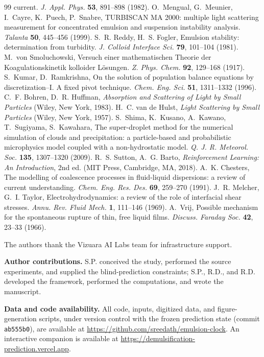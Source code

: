 \documentclass[aps,prfluids,reprint,amsmath,amssymb,superscriptaddress,longbibliography]{revtex4-2}
\begin{document}
\begin{thebibliography}{99}
current. \emph{J. Appl. Phys.} \textbf{53}, 891--898 (1982).
 O.~Mengual, G.~Meunier, I.~Cayre, K.~Puech,
P.~Snabre, TURBISCAN MA 2000: multiple light scattering measurement for
concentrated emulsion and suspension instability analysis. \emph{Talanta}
\textbf{50}, 445--456 (1999).
 S.~R. Reddy, H.~S. Fogler, Emulsion stability:
determination from turbidity. \emph{J. Colloid Interface Sci.} \textbf{79},
101--104 (1981).
 M.~von Smoluchowski, Versuch einer mathematischen
Theorie der Koagulationskinetik kolloider L\"osungen. \emph{Z. Phys. Chem.}
\textbf{92}, 129--168 (1917).
 S.~Kumar, D.~Ramkrishna, On the solution of population
balance equations by discretization--I. A fixed pivot technique.
\emph{Chem. Eng. Sci.} \textbf{51}, 1311--1332 (1996).
 C.~F. Bohren, D.~R. Huffman, \emph{Absorption and
Scattering of Light by Small Particles} (Wiley, New York, 1983).
 H.~C. van de Hulst, \emph{Light Scattering by Small
Particles} (Wiley, New York, 1957).
 S.~Shima, K.~Kusano, A.~Kawano, T.~Sugiyama,
S.~Kawahara, The super-droplet method for the numerical simulation of
clouds and precipitation: a particle-based and probabilistic microphysics
model coupled with a non-hydrostatic model. \emph{Q. J. R. Meteorol. Soc.} \textbf{135},
1307--1320 (2009).
 R.~S. Sutton, A.~G. Barto, \emph{Reinforcement
Learning: An Introduction}, 2nd ed. (MIT Press, Cambridge, MA, 2018).
 A.~K. Chesters, The modelling of coalescence
processes in fluid-liquid dispersions: a review of current understanding.
\emph{Chem. Eng. Res. Des.} \textbf{69}, 259--270 (1991).
 J.~R. Melcher, G.~I. Taylor, Electrohydrodynamics: a
review of the role of interfacial shear stresses. \emph{Annu. Rev. Fluid
Mech.} \textbf{1}, 111--146 (1969).
 A.~Vrij, Possible mechanism for the spontaneous rupture
of thin, free liquid films. \emph{Discuss. Faraday Soc.} \textbf{42},
23--33 (1966).
\end{thebibliography}

\begin{acknowledgments}
The authors thank the Vizuara AI Labs team for infrastructure support.
\end{acknowledgments}

\noindent\textbf{Author contributions.} S.P. conceived the study, performed
the source experiments, and supplied the blind-prediction constraints;
S.P., R.D., and R.D. developed the framework, performed the computations,
and wrote the manuscript.
\smallskip

\noindent\textbf{Data and code availability.} All code, inputs, digitized
data, and figure-generation scripts, under version control with the frozen
prediction state (commit \texttt{ab555b0}), are available at
\url{https://github.com/sreedath/emulsion-clock}. An interactive companion
is available at
\url{https://demulsification-prediction.vercel.app}.
\end{document}

